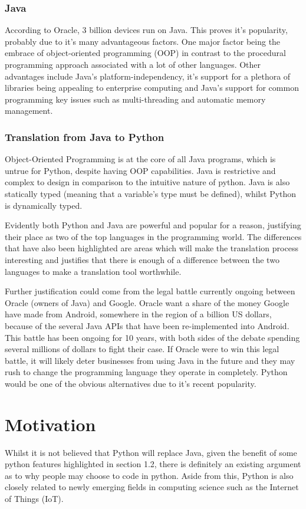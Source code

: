 \documentclass{l4proj}
\begin{document}
\subsubsection{Java}
According to Oracle, 3 billion devices run on Java. This proves it's popularity, probably due to it's many advantageous factors. One major factor being the embrace of object-oriented programming (OOP) in contrast to the procedural programming approach associated with a lot of other languages. Other advantages include Java's platform-independency, it's support for a plethora of libraries being appealing to enterprise computing and Java's support for common programming key issues such as multi-threading and automatic memory management. 

\subsubsection{Translation from Java to Python}
Object-Oriented Programming is at the core of all Java programs, which is untrue for Python, despite having OOP capabilities. Java is restrictive and complex to design in comparison to the intuitive nature of python. Java is also statically typed (meaning that a variable's type must be defined), whilst Python is dynamically typed.

Evidently both Python and Java are powerful and popular for a reason, justifying their place as two of the top languages in the programming world. The differences that have also been highlighted are areas which will make the translation process interesting and justifies that there is enough of a difference between the two languages to make a translation tool worthwhile.

Further justification could come from the legal battle currently ongoing between Oracle (owners of Java) and Google. Oracle want a share of the money Google have made from Android, somewhere in the region of a billion US dollars, because of the several Java APIs that have been re-implemented into Android. This battle has been ongoing for 10 years, with both sides of the debate spending several millions of dollars to fight their case. If Oracle were to win this legal battle, it will likely deter businesses from using Java in the future and they may rush to change the programming language they operate in completely. Python would be one of the obvious alternatives due to it's recent popularity.

\section{Motivation}
Whilst it is not believed that Python will replace Java, given the benefit of some python features highlighted in section 1.2, there is definitely an existing argument as to why people may choose to code in python. Aside from this, Python is also closely related to newly emerging fields in computing science such as the Internet of Things (IoT).
\end{document}
